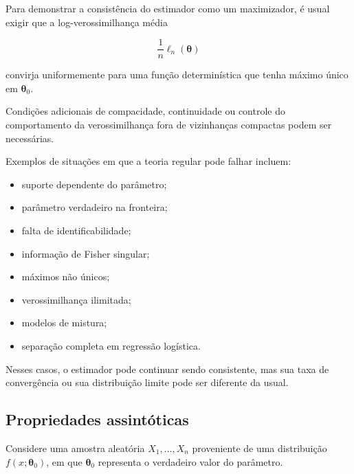 \documentclass[
  letterpaper,
  DIV=11,
  numbers=noendperiod]{scrreprt}
\providecommand{\tightlist}{%
  \setlength{\itemsep}{0pt}\setlength{\parskip}{0pt}}\usepackage{longtable,booktabs,array}
\begin{document}
Para demonstrar a consistência do estimador como um maximizador, é usual
exigir que a log-verossimilhança média

\[\frac{1}{n}\ell_n(\boldsymbol\theta)\]

convirja uniformemente para uma função determinística que tenha máximo
único em \(\boldsymbol\theta_0\).

Condições adicionais de compacidade, continuidade ou controle do
comportamento da verossimilhança fora de vizinhanças compactas podem ser
necessárias.

\begin{tcolorbox}[enhanced jigsaw, colback=white, leftrule=.75mm, colbacktitle=quarto-callout-note-color!10!white, breakable, titlerule=0mm, bottomtitle=1mm, title=\textcolor{quarto-callout-note-color}{\faInfo}\hspace{0.5em}{Modelos não regulares}, colframe=quarto-callout-note-color-frame, toprule=.15mm, opacityback=0, bottomrule=.15mm, opacitybacktitle=0.6, arc=.35mm, toptitle=1mm, rightrule=.15mm, coltitle=black, left=2mm]

Exemplos de situações em que a teoria regular pode falhar incluem:

\begin{itemize}
\tightlist
\item
  suporte dependente do parâmetro;
\item
  parâmetro verdadeiro na fronteira;
\item
  falta de identificabilidade;
\item
  informação de Fisher singular;
\item
  máximos não únicos;
\item
  verossimilhança ilimitada;
\item
  modelos de mistura;
\item
  separação completa em regressão logística.
\end{itemize}

Nesses casos, o estimador pode continuar sendo consistente, mas sua taxa
de convergência ou sua distribuição limite pode ser diferente da usual.

\end{tcolorbox}

\subsection{Propriedades
assintóticas}\label{propriedades-assintuxf3ticas}

Considere uma amostra aleatória \(X_1,\ldots,X_n\) proveniente de uma
distribuição \(f(x;\boldsymbol\theta_0)\), em que
\(\boldsymbol\theta_0\) representa o verdadeiro valor do parâmetro.
\end{document}
